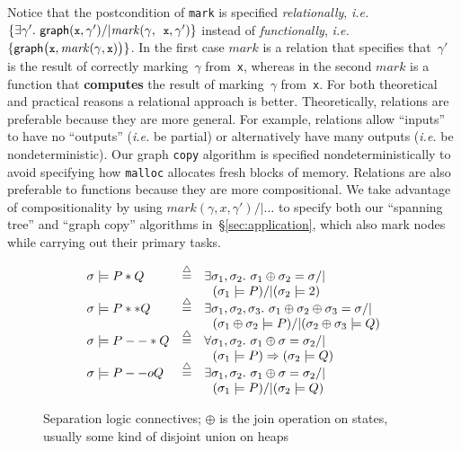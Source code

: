 \documentclass[acmsmall,screen]{acmart}  %
\newcommand{\li}[1]{{\texttt{\small #1}}} %
\newcommand{\defeq}{\mathbin{\stackrel{\triangle}{=}}} %
\newcommand{\p}[1]{\ensuremath{\mathsf{#1}}} \newcommand{\m}[1]{\ensuremath{\mathit{#1}}} \newcommand{\ma}[1]{\ensuremath{\mathcal{#1}}} \let\ramify\lightning
\begin{document}
{Notice that the postcondition of \li{mark} is specified \emph{relationally}, \emph{i.e.} $\{\exists \gamma'.~ \p{graph}(\li{x},\gamma') /| \m{mark}(\gamma, \li{x}, \gamma')\}$ instead of \emph{functionally}, \emph{i.e.} $\{\p{graph}\big(\li{x},\m{mark}(\gamma, \li{x})\big)\}$. In the first case $\m{mark}$ is a relation that specifies that~$\gamma'$ is the result of correctly marking~$\gamma$ from~\li{x}, whereas in the second $\m{mark}$ is a function that \textbf{computes} the result of marking~$\gamma$ from~\li{x}. For both theoretical and practical reasons a relational approach is better.
Theoretically, relations are preferable because they are more general.  For example, relations allow ``inputs'' to have no ``outputs'' (\emph{i.e.} be partial) or alternatively have many outputs (\emph{i.e.} be nondeterministic).  Our graph \li{copy} algorithm is specified nondeterministically to avoid specifying how \li{malloc} allocates fresh blocks of memory.  Relations are also preferable to functions because they are more compositional.
We take advantage of compositionality by using $\m{mark}(\gamma,x,\gamma') /| \ldots$ to specify both our ``spanning tree'' and ``graph copy'' algorithms in~\S\ref{sec:application}, which also mark nodes while carrying out their primary tasks.

\begin{figure}
\[
\begin{array}{lcl}
\sigma |= P * Q & \defeq & \exists \sigma_1, \sigma_2.~ \sigma_1 \oplus \sigma_2 = \sigma /| \null \\ && ~~ (\sigma_1 |= P) /| (\sigma_2 |= 2)\\
[-2pt]
\sigma |= P ** Q & \defeq & \exists \sigma_1, \sigma_2, \sigma_3.~ \sigma_1 \oplus \sigma_2 \oplus \sigma_3 = \sigma /| \null \\ && ~~ (\sigma_1 \oplus \sigma_2 |= P) /| (\sigma_2 \oplus \sigma_3 |= Q) \\
[-2pt]
\sigma |= P --* Q & \defeq & \forall \sigma_1, \sigma_2.~ \sigma_1 \oplus \sigma = \sigma_2 /| \null \\ && ~~
(\sigma_1 |= P) => (\sigma_2 |= Q) \\
[-2pt]
\sigma |= P --o Q & \defeq & \exists \sigma_1, \sigma_2.~ \sigma_1 \oplus \sigma = \sigma_2 /| \null \\ && ~~
(\sigma_1 |= P) /| (\sigma_2 |= Q)
\end{array}
\]
\vspace*{-1.5em}
\caption{Separation logic connectives; $\oplus$ is the join operation on states, usually some kind of disjoint union on heaps}
\label{fig:seplogsem}
\vspace*{-1em}
\end{figure}

}
\end{document}
